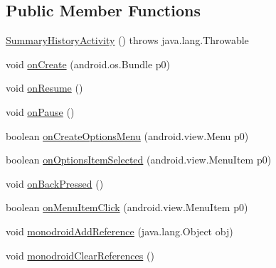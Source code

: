 \subsection*{Public Member Functions}
\begin{DoxyCompactItemize}
\item 
\hyperlink{classfieldservice_1_1android_1_1activities_1_1_summary_history_activity_a6bdf7670b5dab5b63b37ede9e9a7f01f}{Summary\+History\+Activity} ()  throws java.\+lang.\+Throwable 	
\item 
void \hyperlink{classfieldservice_1_1android_1_1activities_1_1_summary_history_activity_a79533eaea554904fea7f85a5e331e9c0}{on\+Create} (android.\+os.\+Bundle p0)
\item 
void \hyperlink{classfieldservice_1_1android_1_1activities_1_1_summary_history_activity_aae8d7be2493935545d33cbdb688c372f}{on\+Resume} ()
\item 
void \hyperlink{classfieldservice_1_1android_1_1activities_1_1_summary_history_activity_a15d0b0c21a8898911b4d5b8b73a32223}{on\+Pause} ()
\item 
boolean \hyperlink{classfieldservice_1_1android_1_1activities_1_1_summary_history_activity_af42a52fa54a2b348774b9efd1fe4d2bf}{on\+Create\+Options\+Menu} (android.\+view.\+Menu p0)
\item 
boolean \hyperlink{classfieldservice_1_1android_1_1activities_1_1_summary_history_activity_a60d3ec212e96b596263215c4f9253763}{on\+Options\+Item\+Selected} (android.\+view.\+Menu\+Item p0)
\item 
void \hyperlink{classfieldservice_1_1android_1_1activities_1_1_summary_history_activity_ad212c59d6c2c28c52efb50170f61585f}{on\+Back\+Pressed} ()
\item 
boolean \hyperlink{classfieldservice_1_1android_1_1activities_1_1_summary_history_activity_aacce95a746ccf4552a43ddc57ae9485d}{on\+Menu\+Item\+Click} (android.\+view.\+Menu\+Item p0)
\item 
void \hyperlink{classfieldservice_1_1android_1_1activities_1_1_summary_history_activity_a3a1bdf0608a906e3c17976ddd2bfa998}{monodroid\+Add\+Reference} (java.\+lang.\+Object obj)
\item 
void \hyperlink{classfieldservice_1_1android_1_1activities_1_1_summary_history_activity_a06be5dfc585d4c67a9c03dfe78a69384}{monodroid\+Clear\+References} ()
\end{DoxyCompactItemize}


